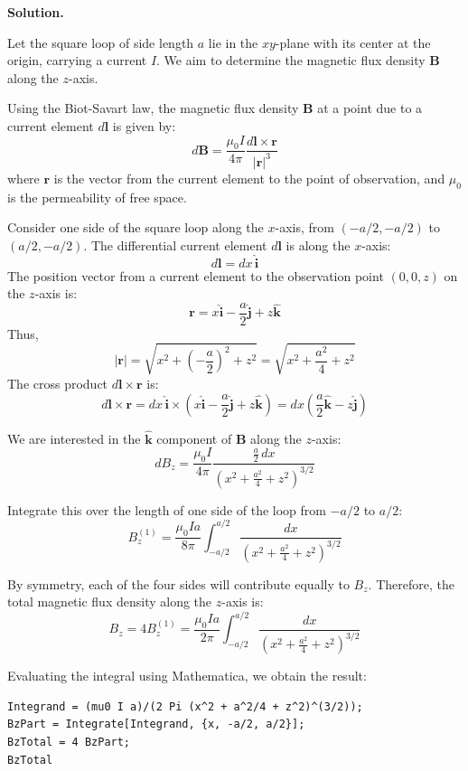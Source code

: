 \documentclass[12pt, a4paper, oneside]{report}
\newenvironment{solution}{
  \par\medskip\noindent
  \textbf{Solution.}\quad\itshape
  \par\noindent\makebox[\linewidth]{\rule{\textwidth}{0.4pt}}
}{
  \par\noindent\makebox[\linewidth]{\rule{\textwidth}{0.4pt}}
  \par\medskip
}
\begin{document}
\begin{solution}

Let the square loop of side length \(a\) lie in the \(xy\)-plane with its center at the origin, carrying a current \(I\). We aim to determine the magnetic flux density \(\mathbf{B}\) along the \(z\)-axis.

Using the Biot-Savart law, the magnetic flux density \(\mathbf{B}\) at a point due to a current element \(d\mathbf{l}\) is given by:
\[
d\mathbf{B} = \frac{\mu_0 I}{4\pi} \frac{d\mathbf{l} \times \mathbf{r}}{|\mathbf{r}|^3}
\]
where \(\mathbf{r}\) is the vector from the current element to the point of observation, and \(\mu_0\) is the permeability of free space.


Consider one side of the square loop along the \(x\)-axis, from \((-a/2, -a/2)\) to \((a/2, -a/2)\). The differential current element \(d\mathbf{l}\) is along the \(x\)-axis:
\[
d\mathbf{l} = dx \, \hat{\mathbf{i}}
\]
The position vector from a current element to the observation point \((0,0,z)\) on the \(z\)-axis is:
\[
\mathbf{r} = x \hat{\mathbf{i}} - \frac{a}{2} \hat{\mathbf{j}} + z \hat{\mathbf{k}}
\]
Thus,
\[
|\mathbf{r}| = \sqrt{x^2 + \left(-\frac{a}{2}\right)^2 + z^2} = \sqrt{x^2 + \frac{a^2}{4} + z^2}
\]
The cross product \(d\mathbf{l} \times \mathbf{r}\) is:
\[
d\mathbf{l} \times \mathbf{r} = dx \, \hat{\mathbf{i}} \times \left( x \hat{\mathbf{i}} - \frac{a}{2} \hat{\mathbf{j}} + z \hat{\mathbf{k}} \right) = dx \left( \frac{a}{2} \hat{\mathbf{k}} - z \hat{\mathbf{j}} \right)
\]

We are interested in the \(\hat{\mathbf{k}}\) component of \(\mathbf{B}\) along the \(z\)-axis:
\[
dB_z = \frac{\mu_0 I}{4\pi} \frac{\frac{a}{2} \, dx}{\left( x^2 + \frac{a^2}{4} + z^2 \right)^{3/2}}
\]


Integrate this over the length of one side of the loop from \(-a/2\) to \(a/2\):
\[
B_z^{(1)} = \frac{\mu_0 I a}{8\pi} \int_{-a/2}^{a/2} \frac{dx}{\left( x^2 + \frac{a^2}{4} + z^2 \right)^{3/2}}
\]


By symmetry, each of the four sides will contribute equally to \(B_z\). Therefore, the total magnetic flux density along the \(z\)-axis is:
\[
B_z = 4 B_z^{(1)} = \frac{\mu_0 I a}{2\pi} \int_{-a/2}^{a/2} \frac{dx}{\left( x^2 + \frac{a^2}{4} + z^2 \right)^{3/2}}
\]


Evaluating the integral using Mathematica, we obtain the result:

\begin{verbatim}
Integrand = (mu0 I a)/(2 Pi (x^2 + a^2/4 + z^2)^(3/2));
BzPart = Integrate[Integrand, {x, -a/2, a/2}];
BzTotal = 4 BzPart;
BzTotal
\end{verbatim}



\end{solution}
\end{document}
